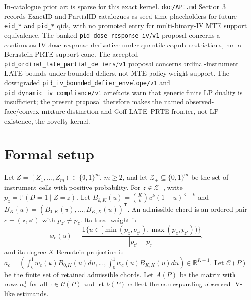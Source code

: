 \documentclass[11pt]{article}
\renewcommand{\Pr}{\mathbb{P}}
\newcommand{\one}{\mathbf{1}}
\newcommand{\transpose}{\mathsf{T}}
\theoremstyle{definition}
\theoremstyle{plain}
\theoremstyle{remark}
\begin{document}
In-catalogue prior art is sparse for this exact kernel. \texttt{doc/API.md} Section 3 records ExactID and PartialID catalogues as seed-time placeholders for future \texttt{eid\_*} and \texttt{pid\_*} qids, with no promoted entry for multi-binary-IV MTE support equivalence. The banked \texttt{pid\_dose\_response\_iv/v1} proposal concerns a continuous-IV dose-response derivative under quantile-copula restrictions, not a Bernstein PRTE support cone. The accepted \texttt{pid\_ordinal\_late\_partial\_defiers/v1} proposal concerns ordinal-instrument LATE bounds under bounded defiers, not MTE policy-weight support. The downgraded \texttt{pid\_iv\_bounded\_defier\_envelope/v1} and \texttt{pid\_dynamic\_iv\_compliance/v1} artefacts warn that generic finite LP duality is insufficient; the present proposal therefore makes the named observed-face/convex-mixture distinction and Goff LATE--PRTE frontier, not LP existence, the novelty kernel.

\section{Formal setup}
Let \(Z=(Z_1,\ldots,Z_m)\in\{0,1\}^m\), \(m\geq2\), and let \(\mathcal Z_+\subseteq\{0,1\}^m\) be the set of instrument cells with positive probability. For \(z\in\mathcal Z_+\), write \(p_z=\Pr(D=1\mid Z=z)\). Let \(B_{k,K}(u)=\binom Kk u^k(1-u)^{K-k}\) and \(B_K(u)=(B_{0,K}(u),\ldots,B_{K,K}(u))^\transpose\). An admissible chord is an ordered pair \(c=(z,z')\) with \(p_{z'}\neq p_z\). Its local weight is
\[
w_c(u)=\frac{\one\{u\in[\min(p_z,p_{z'}),\max(p_z,p_{z'}))\}}{|p_{z'}-p_z|},
\]
and its degree-\(K\) Bernstein projection is \(a_c=(\int_0^1 w_c(u)B_{0,K}(u)du,\ldots,\int_0^1 w_c(u)B_{K,K}(u)du)\in\mathbb R^{K+1}\). Let \(\mathcal C(P)\) be the finite set of retained admissible chords. Let \(A(P)\) be the matrix with rows \(a_c^\transpose\) for all \(c\in\mathcal C(P)\) and let \(b(P)\) collect the corresponding observed IV-like estimands.
\end{document}
